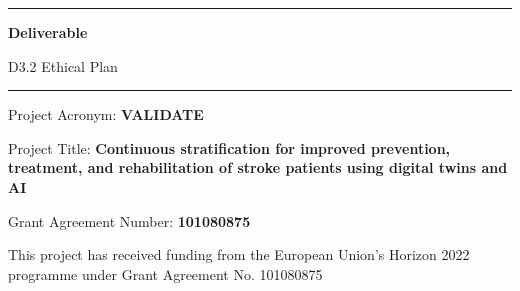 \begin{center}
\end{center}

\hrule
\vspace{0.2cm}

\begin{center}
\huge \textbf{Deliverable}
\end{center}

\begin{center}
\Large D3.2 Ethical Plan
\end{center}

\vspace{0.2cm}
\hrule

\vspace{0.2cm}

\large \noindent Project Acronym: \textbf{VALIDATE}  

\vspace{0.2cm}

\large \noindent Project Title: \textbf{Continuous stratification for improved prevention, treatment, and rehabilitation of stroke patients using digital twins and AI}  

\vspace{0.2cm}

\large \noindent Grant Agreement Number: \textbf{101080875} 

\vspace{0.2cm}


\noindent\newline \newline \small This project has received funding from the European Union’s Horizon 2022 programme under Grant Agreement No. 101080875


\vspace{0.2cm}

